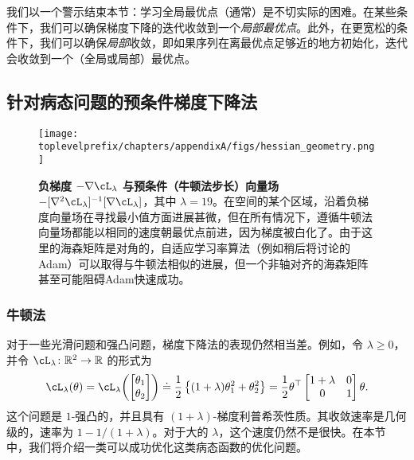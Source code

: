 \documentclass[../../book-main.tex]{subfiles}
\begin{document}
我们以一个警示结束本节：学习全局最优点（通常）是不切实际的困难。在某些条件下，我们可以确保梯度下降的迭代收敛到一个\textit{局部最优点}。此外，在更宽松的条件下，我们可以确保\textit{局部}收敛，即如果序列在离最优点足够近的地方初始化，迭代会收敛到一个（全局或局部）最优点。


\subsection{针对病态问题的预条件梯度下降法}


\begin{figure}
    \texttt{[image: \\toplevelprefix/chapters/appendixA/figs/hessian\_geometry.png]}
    \caption{\small\textbf{负梯度 \(-\nabla \cL_{\lambda}\) 与预条件（牛顿法步长）向量场 \(-[\nabla^{2}\cL_{\lambda}]^{-1}[\nabla \cL_{\lambda}]\)}，其中 \(\lambda = 19\)。在空间的某个区域，沿着负梯度向量场在寻找最小值方面进展甚微，但在所有情况下，遵循牛顿法向量场都能以相同的速度朝最优点前进，因为梯度被白化了。由于这里的海森矩阵是对角的，自适应学习率算法（例如稍后将讨论的Adam）可以取得与牛顿法相似的进展，但一个非轴对齐的海森矩阵甚至可能阻碍Adam快速成功。}
    \label{fig:hessian_geometry}
\end{figure}

\subsubsection{牛顿法}

对于一些光滑问题和强凸问题，梯度下降法的表现仍然相当差。例如，令 \(\lambda \geq 0\)，并令 \(\cL_{\lambda} \colon \R^{2} \to \R\) 的形式为
\begin{equation}
    \cL_{\lambda}(\theta) = \cL_{\lambda}\rp{\mat{\theta_{1} \\ \theta_{2}}} \doteq \frac{1}{2}\bc{(1 + \lambda) \theta_{1}^{2} + \theta_{2}^{2}} = \frac{1}{2}\theta^{\top}\mat{1 + \lambda & 0 \\ 0 & 1}\theta.
\end{equation}
这个问题是 \(1\)-强凸的，并且具有 \((1 + \lambda)\)-梯度利普希茨性质。其收敛速率是几何级的，速率为 \(1 - 1/(1 + \lambda)\)。对于大的 \(\lambda\)，这个速度仍然不是很快。在本节中，我们将介绍一类可以成功优化这类病态函数的优化问题。
\end{document}
